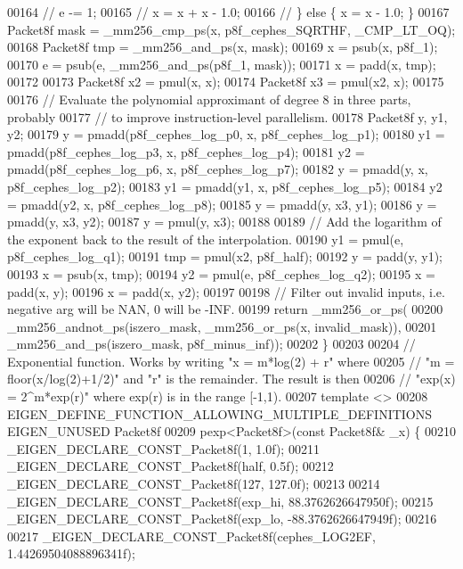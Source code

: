 \begin{DoxyCode}
00164   \textcolor{comment}{//     e -= 1;}
00165   \textcolor{comment}{//     x = x + x - 1.0;}
00166   \textcolor{comment}{//   \} else \{ x = x - 1.0; \}}
00167   Packet8f mask = \_mm256\_cmp\_ps(x, p8f\_cephes\_SQRTHF, \_CMP\_LT\_OQ);
00168   Packet8f tmp = \_mm256\_and\_ps(x, mask);
00169   x = psub(x, p8f\_1);
00170   e = psub(e, \_mm256\_and\_ps(p8f\_1, mask));
00171   x = padd(x, tmp);
00172 
00173   Packet8f x2 = pmul(x, x);
00174   Packet8f x3 = pmul(x2, x);
00175 
00176   \textcolor{comment}{// Evaluate the polynomial approximant of degree 8 in three parts, probably}
00177   \textcolor{comment}{// to improve instruction-level parallelism.}
00178   Packet8f y, y1, y2;
00179   y = pmadd(p8f\_cephes\_log\_p0, x, p8f\_cephes\_log\_p1);
00180   y1 = pmadd(p8f\_cephes\_log\_p3, x, p8f\_cephes\_log\_p4);
00181   y2 = pmadd(p8f\_cephes\_log\_p6, x, p8f\_cephes\_log\_p7);
00182   y = pmadd(y, x, p8f\_cephes\_log\_p2);
00183   y1 = pmadd(y1, x, p8f\_cephes\_log\_p5);
00184   y2 = pmadd(y2, x, p8f\_cephes\_log\_p8);
00185   y = pmadd(y, x3, y1);
00186   y = pmadd(y, x3, y2);
00187   y = pmul(y, x3);
00188 
00189   \textcolor{comment}{// Add the logarithm of the exponent back to the result of the interpolation.}
00190   y1 = pmul(e, p8f\_cephes\_log\_q1);
00191   tmp = pmul(x2, p8f\_half);
00192   y = padd(y, y1);
00193   x = psub(x, tmp);
00194   y2 = pmul(e, p8f\_cephes\_log\_q2);
00195   x = padd(x, y);
00196   x = padd(x, y2);
00197 
00198   \textcolor{comment}{// Filter out invalid inputs, i.e. negative arg will be NAN, 0 will be -INF.}
00199   \textcolor{keywordflow}{return} \_mm256\_or\_ps(
00200       \_mm256\_andnot\_ps(iszero\_mask, \_mm256\_or\_ps(x, invalid\_mask)),
00201       \_mm256\_and\_ps(iszero\_mask, p8f\_minus\_inf));
00202 \}
00203 
00204 \textcolor{comment}{// Exponential function. Works by writing "x = m*log(2) + r" where}
00205 \textcolor{comment}{// "m = floor(x/log(2)+1/2)" and "r" is the remainder. The result is then}
00206 \textcolor{comment}{// "exp(x) = 2^m*exp(r)" where exp(r) is in the range [-1,1).}
00207 \textcolor{keyword}{template} <>
00208 EIGEN\_DEFINE\_FUNCTION\_ALLOWING\_MULTIPLE\_DEFINITIONS EIGEN\_UNUSED Packet8f
00209 pexp<Packet8f>(\textcolor{keyword}{const} Packet8f& \_x) \{
00210   \_EIGEN\_DECLARE\_CONST\_Packet8f(1, 1.0f);
00211   \_EIGEN\_DECLARE\_CONST\_Packet8f(half, 0.5f);
00212   \_EIGEN\_DECLARE\_CONST\_Packet8f(127, 127.0f);
00213 
00214   \_EIGEN\_DECLARE\_CONST\_Packet8f(exp\_hi, 88.3762626647950f);
00215   \_EIGEN\_DECLARE\_CONST\_Packet8f(exp\_lo, -88.3762626647949f);
00216 
00217   \_EIGEN\_DECLARE\_CONST\_Packet8f(cephes\_LOG2EF, 1.44269504088896341f);

\end{DoxyCode}
